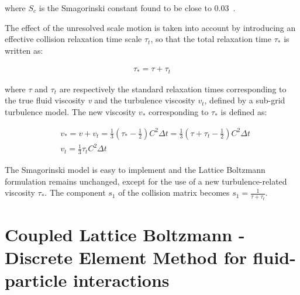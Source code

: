 where $\mathit{S}_{c}$ is the Smagorinski constant found to be close to 
0.03~\citep{yu2005}. 

The effect of the unresolved scale motion is taken into account by introducing 
an effective collision relaxation time scale $\tau_{t}$, so that the total 
relaxation time $\tau_{*}$ is written as:

\begin{align}
\tau_{*}=\tau + \tau_{t}
\end{align} 

where $\tau$ and $\tau_{t}$ are respectively the standard relaxation times 
corresponding to the true fluid viscosity \textit{v} and the turbulence 
viscosity $\mathit{v}_{\mathit{t}}$, defined by a sub-grid turbulence model. 
The new viscosity $\mathit{v}_{*}$ corresponding to $\tau_{*}$ is defined as:

\begin{align}
& 
\mathit{v}_{*}=\mathit{v}+\mathit{v}_{\mathit{t}}=\frac{1}{3}(\tau_{*}-\frac{1}{2})
\mathit{C}^{2} \Delta \mathit{t} 
=\frac{1}{3}(\tau+\tau_{t}-\frac{1}{2})\mathit{C}^{2} \Delta \mathit{t}  \\
& \mathit{v}_{\mathit{t}}=\frac{1}{3}\tau_{\mathit{t}}\mathit{C}^{2} \Delta 
\textit{t}
\end{align} 

The Smagorinski model is easy to implement and the Lattice Boltzmann 
formulation remains unchanged, except for the use of a new turbulence-related 
viscosity $\tau_{*}$. The component $s_1$ of the collision matrix becomes $s_1 
= \frac{1}{\tau+\tau_t}$.


\section{Coupled Lattice Boltzmann - Discrete Element Method for fluid-particle
interactions}

